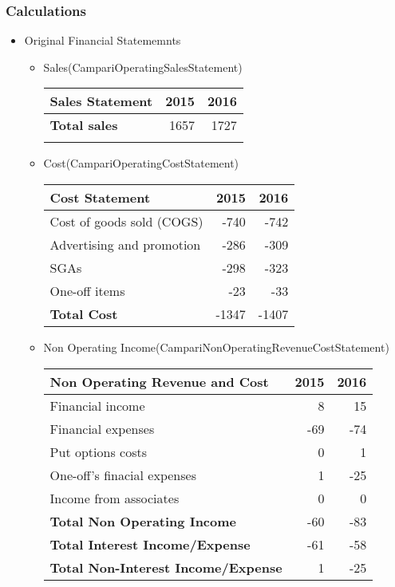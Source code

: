 \documentclass[11pt]{article}
\begin{document}
\subsubsection*{Calculations}
\label{sec:org3200477}
\begin{itemize}
\item Original Financial Statememnts
\label{sec:orgc4cfee8}
\begin{itemize}
\item Sales(CampariOperatingSalesStatement)
\label{sec:org4d211e1}
\begin{table}[htbp]
\label{CampariOperatingSalesStatement}
\centering
\begin{tabular}{lrr}
\textbf{Sales Statement} & 2015 & 2016\\
\hline
\textbf{Total sales} & 1657 & 1727\\
 &  & \\
\hline
\end{tabular}
\end{table}
\item Cost(CampariOperatingCostStatement)
\label{sec:org05ea3dd}
\begin{table}[htbp]
\label{CampariOperatingCostStatement}
\centering
\begin{tabular}{lrr}
\textbf{Cost Statement} & 2015 & 2016\\
\hline
Cost of goods sold (COGS) & -740 & -742\\
Advertising and promotion & -286 & -309\\
SGAs & -298 & -323\\
One-off items & -23 & -33\\
\hline
\textbf{Total Cost} & -1347 & -1407\\
\hline
\end{tabular}
\end{table}

\item Non Operating Income(CampariNonOperatingRevenueCostStatement)
\label{sec:org65e238d}
\begin{table}[htbp]
\label{CampariNonOperatingRevenueCostStatement}
\centering
\begin{tabular}{lrr}
\textbf{Non Operating Revenue and Cost} & 2015 & 2016\\
\hline
Financial income & 8 & 15\\
Financial expenses & -69 & -74\\
Put options costs & 0 & 1\\
\hline
One-off's finacial expenses & 1 & -25\\
Income from associates & 0 & 0\\
\hline
\textbf{Total Non Operating Income} & -60 & -83\\
\hline
\textbf{Total Interest Income/Expense} & -61 & -58\\
\hline
\textbf{Total Non-Interest Income/Expense} & 1 & -25\\
\hline
\end{tabular}
\end{table}


\end{itemize}
\end{itemize}
\end{document}
